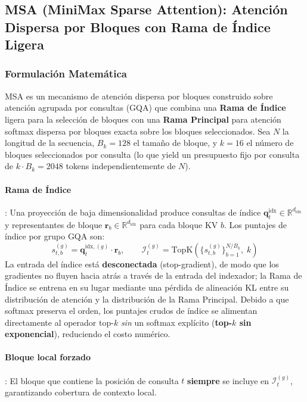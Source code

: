 \subsection{MSA (MiniMax Sparse Attention): Atención Dispersa por Bloques con Rama de Índice Ligera}

\subsubsection{Formulación Matemática}

MSA \citep{lai_minimax_2026} es un mecanismo de atención dispersa por bloques construido sobre atención agrupada por consultas (GQA) que combina una \textbf{Rama de Índice} ligera para la selección de bloques con una \textbf{Rama Principal} para atención softmax dispersa por bloques exacta sobre los bloques seleccionados. Sea $N$ la longitud de la secuencia, $B_k = 128$ el tamaño de bloque, y $k = 16$ el número de bloques seleccionados por consulta (lo que yield un presupuesto fijo por consulta de $k \cdot B_k = 2048$ tokens independientemente de $N$).

\paragraph{Rama de Índice}: Una proyección de baja dimensionalidad produce consultas de índice $\mathbf{q}_t^{\text{idx}} \in \mathbb{R}^{d_{\text{idx}}}$ y representantes de bloque $\mathbf{r}_b \in \mathbb{R}^{d_{\text{idx}}}$ para cada bloque KV $b$. Los puntajes de índice por grupo GQA son:
\[
s_{t,b}^{(g)} = \mathbf{q}_t^{\text{idx},(g)} \cdot \mathbf{r}_b, \qquad \mathcal{I}_t^{(g)} = \mathrm{TopK}\left(\{s_{t,b}^{(g)}\}_{b=1}^{N/B_k},\; k\right)
\]
La entrada del índice está \textbf{desconectada} (stop-gradient), de modo que los gradientes no fluyen hacia atrás a través de la entrada del indexador; la Rama de Índice se entrena en su lugar mediante una pérdida de alineación KL entre su distribución de atención y la distribución de la Rama Principal. Debido a que softmax preserva el orden, los puntajes crudos de índice se alimentan directamente al operador top-$k$ \emph{sin} un softmax explícito (\textbf{top-$k$ sin exponencial}), reduciendo el costo numérico.

\paragraph{Bloque local forzado}: El bloque que contiene la posición de consulta $t$ \textbf{siempre} se incluye en $\mathcal{I}_t^{(g)}$, garantizando cobertura de contexto local.

